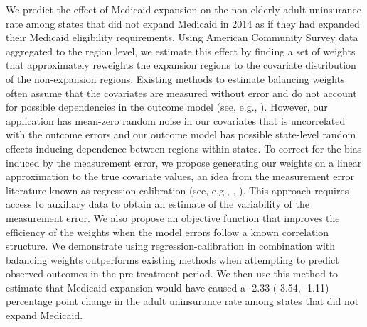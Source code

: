\documentclass[aoas]{imsart}
\theoremstyle{plain}
\theoremstyle{remark}
\begin{document}
\begin{frontmatter}
\begin{flushleft}
We predict the effect of Medicaid expansion on the non-elderly adult uninsurance rate among states that did not expand Medicaid in 2014 as if they had expanded their Medicaid eligibility requirements. Using American Community Survey data aggregated to the region level, we estimate this effect by finding a set of weights that approximately reweights the expansion regions to the covariate distribution of the non-expansion regions. Existing methods to estimate balancing weights often assume that the covariates are measured without error and do not account for possible dependencies in the outcome model (see, e.g., \cite{zubizarreta2015stable}). However, our application has mean-zero random noise in our covariates that is uncorrelated with the outcome errors and our outcome model has possible state-level random effects inducing dependence between regions within states. To correct for the bias induced by the measurement error, we propose generating our weights on a linear approximation to the true covariate values, an idea from the measurement error literature known as regression-calibration (see, e.g., \cite{gleser1992importance}, \cite{carroll2006measurement}). This approach requires access to auxillary data to obtain an estimate of the variability of the measurement error. We also propose an objective function that improves the efficiency of the weights when the model errors follow a known correlation structure. We demonstrate using regression-calibration in combination with balancing weights outperforms existing methods when attempting to predict observed outcomes in the pre-treatment period. We then use this method to estimate that Medicaid expansion would have caused a -2.33 (-3.54, -1.11) percentage point change in the adult uninsurance rate among states that did not expand Medicaid.
\end{flushleft}


\begin{keyword}
\end{keyword}

\end{frontmatter}

\end{document}
